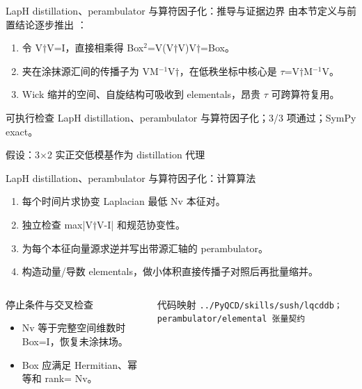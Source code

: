 \begin{frame}[t]{LapH distillation、perambulator 与算符因子化：推导与证据边界}
\footnotesize
{}\quad 由本节定义与前置结论逐步推出 ：
\begin{enumerate}
\item 令 V†V=I，直接相乘得 Box\ensuremath{^{2}}=V(V†V)V†=Box。
\item 夹在涂抹源汇间的传播子为 VM\ensuremath{^{-1}}V†，在低秩坐标中核心是 \ensuremath{\tau}=V†M\ensuremath{^{-1}}V。
\item Wick 缩并的空间、自旋结构可吸收到 elementals，昂贵 \ensuremath{\tau} 可跨算符复用。
\end{enumerate}\begin{block}{可执行检查}
\quad LapH distillation、perambulator 与算符因子化；3/3 项通过；SymPy exact。
\par\scriptsize 假设：3\ensuremath{\times}2 实正交低模基作为 distillation 代理
\end{block}
\end{frame}

\begin{frame}[t]{LapH distillation、perambulator 与算符因子化：计算算法}
\footnotesize
{}\begin{enumerate}
\item 每个时间片求协变 Laplacian 最低 Nv 本征对。
\item 独立检查 max|V†V-I| 和规范协变性。
\item 为每个本征向量源求逆并写出带源汇轴的 perambulator。
\item 构造动量/\allowbreak{}导数 elementals，做小体积直接传播子对照后再批量缩并。
\end{enumerate}\begin{columns}[T,onlytextwidth]
\begin{block}{停止条件与交叉检查}\scriptsize\begin{itemize}
\item[\CheckMark] Nv 等于完整空间维数时 Box=I，恢复未涂抹场。
\item[\CheckMark] Box 应满足 Hermitian、幂等和 rank= Nv。
\end{itemize}\end{block}
\begin{block}{代码映射}
\scriptsize \texttt{.\allowbreak{}.\allowbreak{}/\allowbreak{}PyQCD/\allowbreak{}skills/\allowbreak{}sush/\allowbreak{}lqcddb；perambulator/\allowbreak{}elemental 张量契约}
\end{block}\end{columns}\end{frame}

